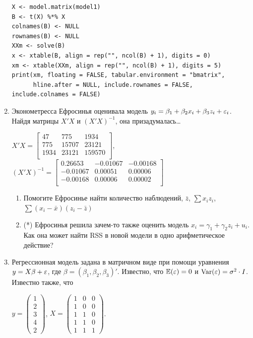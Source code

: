 \documentclass[12pt, a4paper]{article}
\begin{document}
\begin{enumerate}
\begin{verbatim}
X <- model.matrix(model1)
B <- t(X) %*% X
colnames(B) <- NULL
rownames(B) <- NULL
XXm <- solve(B)
x <- xtable(B, align = rep("", ncol(B) + 1), digits = 0)
xm <- xtable(XXm, align = rep("", ncol(B) + 1), digits = 5)
print(xm, floating = FALSE, tabular.environment = "bmatrix",
      hline.after = NULL, include.rownames = FALSE, include.colnames = FALSE)
\end{verbatim}



\item Эконометресса Ефросинья оценивала модель $y_i=\beta_1 + \beta_2 x_i + \beta_3 z_i + \varepsilon_i$. Найдя матрицы $X'X$ и $(X'X)^{-1}$, она призадумалась\ldots

$X'X = \begin{bmatrix}{}
  47 & 775 & 1934 \\
  775 & 15707 & 23121 \\
  1934 & 23121 & 159570 \\
  \end{bmatrix}$,
$(X'X)^{-1}=\begin{bmatrix}{}
  0.26653 & -0.01067 & -0.00168 \\
  -0.01067 & 0.00051 & 0.00006 \\
  -0.00168 & 0.00006 & 0.00002 \\
  \end{bmatrix}$


\begin{enumerate}
\item Помогите Ефросинье найти количество наблюдений, $\bar{z}$, $\sum x_i z_i$, $\sum(x_i-\bar{x})(z_i-\bar{z})$
\item (*) Ефросинья решила зачем-то также оценить модель $x_i = \gamma_1 + \gamma_2 z_i + u_i$. Как она может найти RSS в новой модели в одно арифметическое действие?
\end{enumerate}

\item Регрессионная модель  задана в матричном виде при помощи уравнения $y=X\beta+\varepsilon$, где $\beta=(\beta_1,\beta_2,\beta_3)'$.
Известно, что $\mathbb{E}(\varepsilon)=0$  и  $\operatorname{Var}(\varepsilon)=\sigma^2\cdot I$.
Известно также, что

$y=\left(
\begin{array}{c}
1\\
2\\
3\\
4\\
2
\end{array}\right)$,
$X=\left(\begin{array}{ccc}
1 & 0 & 0 \\
1 & 0 & 0 \\
1 & 1 & 0 \\
1 & 1 & 0 \\
1 & 1 & 1
\end{array}\right)$.



\end{enumerate}
\end{document}
